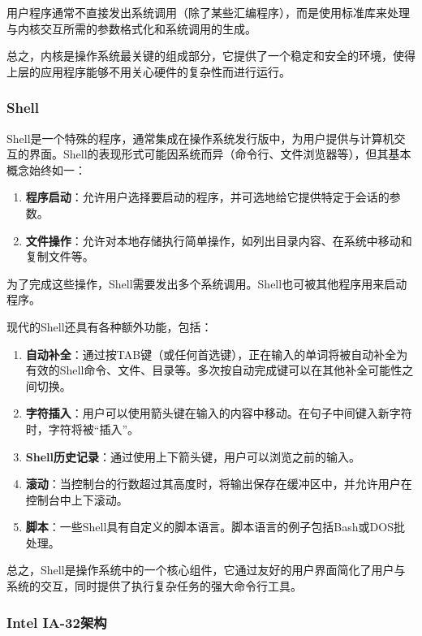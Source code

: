 用户程序通常不直接发出系统调用（除了某些汇编程序），而是使用标准库来处理与内核交互所需的参数格式化和系统调用的生成。

总之，内核是操作系统最关键的组成部分，它提供了一个稳定和安全的环境，使得上层的应用程序能够不用关心硬件的复杂性而进行运行。

\subsubsection{Shell}

Shell是一个特殊的程序，通常集成在操作系统发行版中，为用户提供与计算机交互的界面。Shell的表现形式可能因系统而异（命令行、文件浏览器等），但其基本概念始终如一：

\begin{enumerate}
    \item \textbf{程序启动}：允许用户选择要启动的程序，并可选地给它提供特定于会话的参数。
    \item \textbf{文件操作}：允许对本地存储执行简单操作，如列出目录内容、在系统中移动和复制文件等。
\end{enumerate}

为了完成这些操作，Shell需要发出多个系统调用。Shell也可被其他程序用来启动程序。

现代的Shell还具有各种额外功能，包括：

\begin{enumerate}
    \item \textbf{自动补全}：通过按TAB键（或任何首选键），正在输入的单词将被自动补全为有效的Shell命令、文件、目录等。多次按自动完成键可以在其他补全可能性之间切换。
    \item \textbf{字符插入}：用户可以使用箭头键在输入的内容中移动。在句子中间键入新字符时，字符将被“插入”。
    \item \textbf{Shell历史记录}：通过使用上下箭头键，用户可以浏览之前的输入。
    \item \textbf{滚动}：当控制台的行数超过其高度时，将输出保存在缓冲区中，并允许用户在控制台中上下滚动。
    \item \textbf{脚本}：一些Shell具有自定义的脚本语言。脚本语言的例子包括Bash或DOS批处理。
\end{enumerate}

总之，Shell是操作系统中的一个核心组件，它通过友好的用户界面简化了用户与系统的交互，同时提供了执行复杂任务的强大命令行工具。

\subsubsection{Intel IA-32架构}

